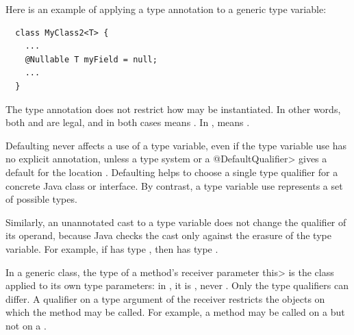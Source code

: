 Here is an example of applying a type annotation to a generic type
variable:

\begin{Verbatim}
  class MyClass2<T> {
    ...
    @Nullable T myField = null;
    ...
  }
\end{Verbatim}

\noindent
The type annotation does not restrict how  may be
instantiated.  In other words, both
 and  are
legal, and in both cases  means .
In ,
 means .





Defaulting never affects a use of a type variable, even if the type
variable use has no explicit annotation, unless a type system or a
\<@DefaultQualifier> gives a default for the location
.  Defaulting helps to choose a
single type qualifier for a concrete Java class or interface.  By contrast,
a type variable use represents a set of possible types.

Similarly, an unannotated cast to a type variable does not change the
qualifier of its operand, because Java checks the cast only against the
erasure of the type variable.  For example, if  has type
, then  has type .



In a generic class, the type of a method's receiver parameter \<this> is the
class applied to its own type parameters:  in , it is
, never .  Only the type qualifiers
can differ.  A qualifier on a type argument of the receiver restricts the
objects on which the method may be called.  For example, a method
 may be called on a
 but not on a .

